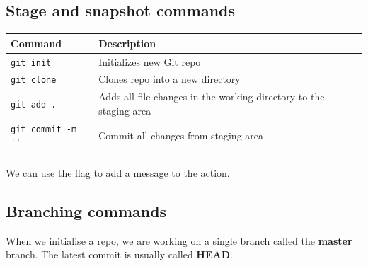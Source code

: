 \documentclass{article}
\begin{document}
\subsection{Stage and snapshot commands}
\begin{table}[H]
    \begin{tabular}{ll}
        \textbf{Command}             & \textbf{Description}                                               \\ \hline
        \lstinline|git init|         & Initializes new Git repo                                           \\ \arrayrulecolor{lightgray}\hline
        \lstinline|git clone|        & Clones repo into a new directory                                   \\ \arrayrulecolor{lightgray}\hline
        \lstinline|git add . |       & Adds all file changes in the working directory to the staging area \\ \arrayrulecolor{lightgray}\hline
        \lstinline|git commit -m ''| & Commit all changes from staging area                               \\ \arrayrulecolor{lightgray}\hline
    \end{tabular}
\end{table}
We can use the  flag to add a message to the action.
\subsection{Branching commands}
When we initialise a repo, we are working on a single branch called the \textbf{master} branch. The latest commit is usually called \textbf{HEAD}.
\end{document}
